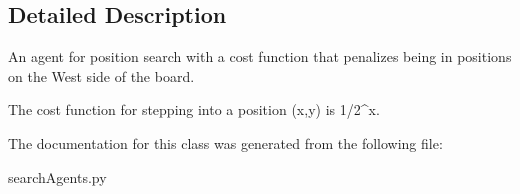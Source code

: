 \subsection{Detailed Description}
\begin{DoxyVerb}An agent for position search with a cost function that penalizes being in
positions on the West side of the board.

The cost function for stepping into a position (x,y) is 1/2^x.
\end{DoxyVerb}
 

The documentation for this class was generated from the following file\+:\begin{DoxyCompactItemize}
\item 
search\+Agents.\+py\end{DoxyCompactItemize}
